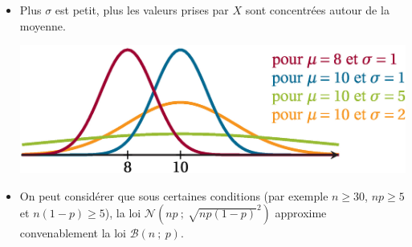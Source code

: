 \documentclass{cornouaille}
\begin{document}
\begin{remarques}

\begin{itemize}
\item Plus $\sigma$ est petit, plus les valeurs prises par $X$ sont concentrées autour de la moyenne.




\includegraphics{./TS-Variables-14}



\item On peut considérer que sous certaines conditions (par exemple ${n\geqslant30}$, ${np\geqslant 5}$ et ${n(1-p)\geqslant5}$), la loi $\mathcal{N}(np\ ;\ \sqrt{np(1-p)}^2)$ approxime convenablement la loi $\mathcal{B}(n\ ;\ p)$.
\end{itemize}


\end{remarques}
\end{document}
